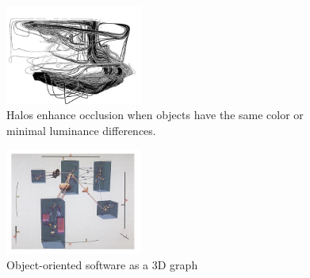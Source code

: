 \begin{mdframed}
\begin{multicols}{2}
    \begin{figure}[H]
        \centering
        \includegraphics[width=0.4\textwidth]{streamlines.png}
        \caption{Halos enhance occlusion when objects have the same color or
        minimal luminance differences.}
    \end{figure}
    \begin{figure}[H]
        \centering
        \includegraphics[width=0.4\textwidth]{3d_graph.png}
        \caption{Object-oriented software as a 3D graph}
    \end{figure}

\end{multicols}\end{mdframed}



